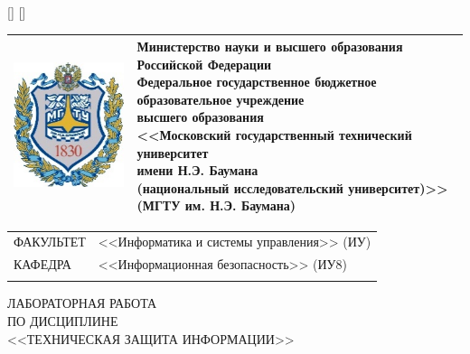\StrLen{\RPZTitleStudent}[\StudentLen]
\StrLen{\RPZTitleTeacher}[\TeacherLen]
\ifthenelse{\StudentLen > \TeacherLen}{\StrLen{\RPZTitleStudent}[\SignLen]}{\StrLen{\RPZTitleTeacher}[\SignLen]}

\pagestyle{empty}
\noindent
\begin{tabularx}{\textwidth}{L{2cm} C{\textwidth - 2.7cm}}
    \includegraphics[scale=1]{inc/bmstu.jpg} &
    {\centering\rmfamily\bfseries\fontsize{11pt}{11pt}\selectfont
    Министерство науки и высшего образования Российской Федерации \\
    Федеральное государственное бюджетное образовательное учреждение \\
    высшего образования \\
    <<Московский государственный технический университет \\
    имени Н.Э. Баумана \\
    (национальный исследовательский университет)>>\\
    (МГТУ им. Н.Э. Баумана)}\\
    \bottomrule[2pt]
    \bottomrule
\end{tabularx}

\noindent
\begin{tabularx}{\textwidth}{lX}
{\fontsize{12pt}{12pt}\selectfont ФАКУЛЬТЕТ}
    &
    {\fontsize{12pt}{12pt}\selectfont <<Информатика и системы управления>> (ИУ)}\\
    \hhline{~~}
    {\fontsize{12pt}{12pt}\selectfont КАФЕДРА} &
    {\fontsize{12pt}{12pt}\selectfont <<Информационная безопасность>> (ИУ8)}\\
    \hhline{~~}
\end{tabularx}
\vfill

\noindent
{\centering\rmfamily\fontsize{20pt}{20pt}\selectfont
ЛАБОРАТОРНАЯ РАБОТА \\ ПО ДИСЦИПЛИНЕ \\ \hfill <<ТЕХНИЧЕСКАЯ ЗАЩИТА ИНФОРМАЦИИ>> \hfill\null}

\vspace{1cm}

